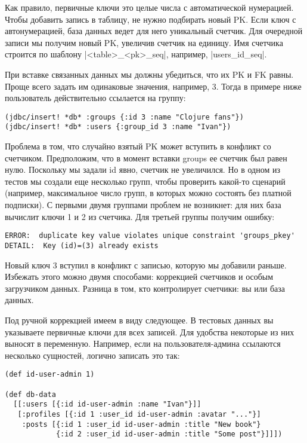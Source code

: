 Как правило, первичные ключи это целые числа с автоматической нумерацией. Чтобы
добавить запись в таблицу, не нужно подбирать новый PK. Если ключ с
автонумерацией, база данных ведет для него уникальный счетчик. Для очередной
записи мы получим новый PK, увеличив счетчик на единицу. Имя счетчика строится
по шаблону \spverb|<table>_<pk>_seq|, например, \spverb|users_id_seq|.

При вставке связанных данных мы должны убедиться, что их PK и FK равны. Проще
всего задать им одинаковые значения, например, 3. Тогда в примере ниже
пользователь действительно ссылается на группу:

\begin{verbatim}
(jdbc/insert! *db* :groups {:id 3 :name "Clojure fans"})
(jdbc/insert! *db* :users {:group_id 3 :name "Ivan"})
\end{verbatim}

Проблема в том, что случайно взятый PK может вступить в конфликт со
счетчиком. Предположим, что в момент вставки groups ее счетчик был равен
нулю. Поскольку мы задали id явно, счетчик не увеличился. Но в одном из тестов
мы создали еще несколько групп, чтобы проверить какой-то сценарий (например,
максимальное число групп, в которых можно состоять без платной подписки). С
первыми двумя группами проблем не возникнет: для них база вычислит ключи 1 и 2
из счетчика. Для третьей группы получим ошибку:

\begin{verbatim}
ERROR:  duplicate key value violates unique constraint 'groups_pkey'
DETAIL:  Key (id)=(3) already exists
\end{verbatim}

Новый ключ 3 вступил в конфликт с записью, которую мы добавили раньше. Избежать
этого можно двумя способами: коррекцией счетчиков и особым загрузчиком
данных. Разница в том, кто контролирует счетчики: вы или база данных.

Под ручной коррекцией имеем в виду следующее. В тестовых данных вы указываете
первичные ключи для всех записей. Для удобства некоторые из них выносят в
переменную. Например, если на пользователя-админа ссылаются несколько сущностей,
логично записать это так:

\begin{verbatim}
(def id-user-admin 1)

(def db-data
  [[:users [{:id id-user-admin :name "Ivan"}]]
   [:profiles [{:id 1 :user_id id-user-admin :avatar "..."}]
    :posts [{:id 1 :user_id id-user-admin :title "New book"}
            {:id 2 :user_id id-user-admin :title "Some post"}]]])
\end{verbatim}

